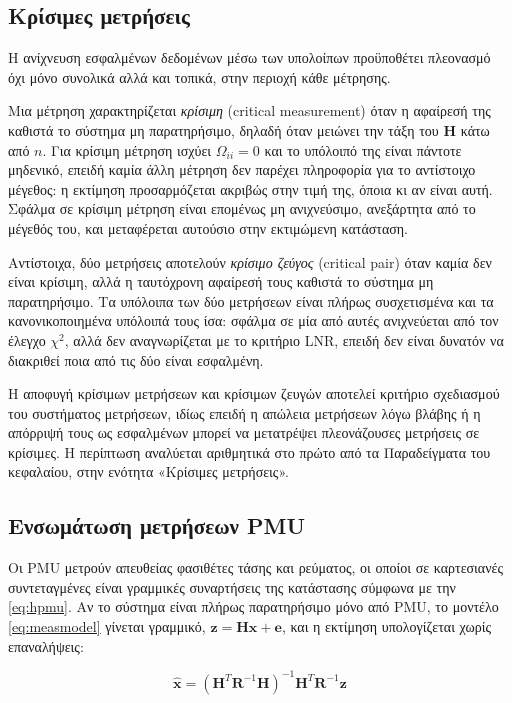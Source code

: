 \subsection{Κρίσιμες μετρήσεις}
\label{sec:critical}

Η ανίχνευση εσφαλμένων δεδομένων μέσω των υπολοίπων προϋποθέτει πλεονασμό όχι μόνο συνολικά
αλλά και τοπικά, στην περιοχή κάθε μέτρησης.

Μια μέτρηση χαρακτηρίζεται \emph{κρίσιμη} (critical measurement) όταν η αφαίρεσή της καθιστά το
σύστημα μη παρατηρήσιμο, δηλαδή όταν μειώνει την τάξη του $\mathbf{H}$ κάτω από $n$. Για
κρίσιμη μέτρηση ισχύει $\Omega_{ii} = 0$ και το υπόλοιπό της είναι πάντοτε μηδενικό, επειδή
καμία άλλη μέτρηση δεν παρέχει πληροφορία για το αντίστοιχο μέγεθος: η εκτίμηση προσαρμόζεται
ακριβώς στην τιμή της, όποια κι αν είναι αυτή. Σφάλμα σε κρίσιμη μέτρηση είναι επομένως μη
ανιχνεύσιμο, ανεξάρτητα από το μέγεθός του, και μεταφέρεται αυτούσιο στην εκτιμώμενη
κατάσταση.

Αντίστοιχα, δύο μετρήσεις αποτελούν \emph{κρίσιμο ζεύγος} (critical pair) όταν καμία δεν είναι
κρίσιμη, αλλά η ταυτόχρονη αφαίρεσή τους καθιστά το σύστημα μη παρατηρήσιμο. Τα υπόλοιπα των
δύο μετρήσεων είναι πλήρως συσχετισμένα και τα κανονικοποιημένα υπόλοιπά τους ίσα: σφάλμα σε
μία από αυτές ανιχνεύεται από τον έλεγχο $\chi^2$, αλλά δεν αναγνωρίζεται με το κριτήριο LNR,
επειδή δεν είναι δυνατόν να διακριθεί ποια από τις δύο είναι εσφαλμένη.

Η αποφυγή κρίσιμων μετρήσεων και κρίσιμων ζευγών αποτελεί κριτήριο σχεδιασμού του συστήματος
μετρήσεων, ιδίως επειδή η απώλεια μετρήσεων λόγω βλάβης ή η απόρριψή τους ως εσφαλμένων
μπορεί να μετατρέψει πλεονάζουσες μετρήσεις σε κρίσιμες. Η περίπτωση αναλύεται αριθμητικά
στο πρώτο από τα Παραδείγματα του κεφαλαίου, στην ενότητα «Κρίσιμες μετρήσεις».

\subsection{Ενσωμάτωση μετρήσεων PMU}

Οι PMU μετρούν απευθείας φασιθέτες τάσης και ρεύματος, οι οποίοι σε καρτεσιανές συντεταγμένες
είναι γραμμικές συναρτήσεις της κατάστασης σύμφωνα με την \eqref{eq:hpmu}. Αν το σύστημα είναι
πλήρως παρατηρήσιμο μόνο από PMU, το μοντέλο \eqref{eq:measmodel} γίνεται γραμμικό,
$\mathbf{z} = \mathbf{H}\mathbf{x} + \mathbf{e}$, και η εκτίμηση υπολογίζεται χωρίς
επαναλήψεις:

\begin{equation}
\hat{\mathbf{x}} = \left(\mathbf{H}^{T}\mathbf{R}^{-1}\mathbf{H}\right)^{-1}
                    \mathbf{H}^{T}\mathbf{R}^{-1}\mathbf{z}
\label{eq:linse}
\end{equation}

